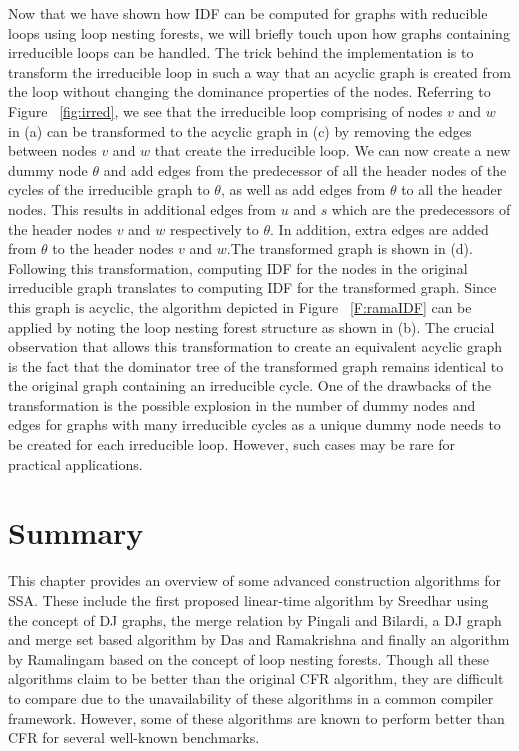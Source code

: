     Now that we have shown how IDF can be computed for graphs with reducible loops using 
    loop nesting forests, we will briefly touch
    upon how graphs containing irreducible loops can be handled. The trick behind the implementation
    is to transform the irreducible loop in such a way that an acyclic graph is created from the loop
    without changing the dominance properties of the nodes. Referring to Figure ~\ref{fig:irred}, we see 
    that the irreducible loop comprising of nodes $v$ and $w$ in (a) can be transformed to the acyclic
    graph in (c) by removing the edges between nodes $v$ and $w$ that create the irreducible loop. 
    We can now create a new dummy node $\theta$ and add edges from the predecessor of all
    the header nodes of the cycles of the irreducible graph to $\theta$, 
    as well as add edges from $\theta$ to all the 
    header nodes. This results in additional edges from $u$ and $s$ which are the predecessors of the
    header nodes $v$ and $w$ respectively to $\theta$. In addition, extra edges are added from $\theta$
    to the header nodes $v$ and $w$.The transformed graph is shown in (d). Following this transformation, 
    computing IDF for the nodes 
    in the original irreducible graph translates to computing IDF for the transformed graph. Since this
    graph is acyclic, the algorithm depicted in Figure ~\ref{F:ramaIDF} can be applied by noting the
    loop nesting forest structure as shown in (b). The crucial observation that allows this transformation 
    to create an equivalent acyclic
    graph is the fact that the dominator tree of the transformed graph remains identical to the
    original graph containing an irreducible cycle. One of the drawbacks of the transformation is the
    possible explosion in the number of dummy nodes and edges for graphs with many irreducible cycles as
    a unique dummy node needs to be created for each irreducible loop. However, such cases may be rare
    for practical applications.

    \section{Summary}
    This chapter provides an overview of some advanced construction algorithms
    for SSA. These include the first proposed linear-time algorithm by Sreedhar using the concept of
    DJ graphs, the merge relation by Pingali and Bilardi, a DJ graph and merge
    set based algorithm by Das and Ramakrishna and finally an algorithm by Ramalingam based on the concept
    of loop nesting forests. Though all these algorithms claim to be better than the original CFR algorithm, 
    they are difficult to compare due to the unavailability of these algorithms in a common compiler framework.
    However, some of these algorithms are known to perform better than CFR for several well-known benchmarks.



